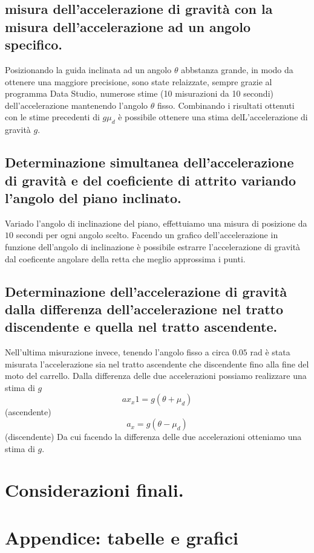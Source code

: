 \documentclass[10pt,oneside,a4paper]{article}
\begin{document}
\subsection{misura dell'accelerazione di gravità con la misura dell'accelerazione ad un angolo specifico.}
Posizionando la guida inclinata ad un angolo $\theta$ abbstanza grande, in modo da ottenere una maggiore precisione, sono state relaizzate, sempre grazie al programma Data Studio, numerose stime (10 misurazioni da 10 secondi) dell'accelerazione mantenendo l'angolo $\theta$ fisso. Combinando i risultati ottenuti con le stime precedenti di $g\mu_d$ è possibile ottenere una stima delL'accelerazione di gravità $g$. 


\subsection{Determinazione simultanea dell'accelerazione di gravità e del coeficiente di attrito variando l'angolo del piano inclinato.}
Variado l'angolo di inclinazione del piano, effettuiamo una misura di posizione da $10$ secondi per ogni angolo scelto. Facendo un grafico dell'accelerazione in funzione dell'angolo di inclinazione è possibile estrarre l'accelerazione di gravità dal coeficente angolare della retta che meglio approssima i punti. 



\subsection{Determinazione dell'accelerazione di gravità dalla differenza dell'accelerazione nel tratto discendente e quella nel tratto ascendente.}
Nell'ultima misurazione invece, tenendo l'angolo fisso a circa $0.05$ rad è stata misurata l'accelerazione sia nel tratto ascendente che discendente fino alla fine del moto del carrello. Dalla differenza delle due accelerazioni possiamo realizzare una stima di $g$
	\begin{equation}
	ax_x1= g(\theta + \mu_d) 
	\end{equation} (ascendente)\newline
	\begin{equation}
	a_x = g(\theta - \mu_d)
	\end{equation} (discendente)
Da cui facendo la differenza delle due accelerazioni otteniamo una stima di $g$.





\section{Considerazioni finali.}




\newpage
\section{Appendice: tabelle e grafici}
\end{document}
